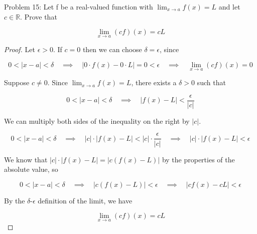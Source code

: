 \usepackage{amsthm}

Problem 15: Let f be a real-valued function with $\lim_{x \rightarrow a} f(x) = L$ and let $c \in \mathbb{R}$. Prove that 

$$ \lim_{x \rightarrow a} (cf)(x) = cL $$

\begin{proof}
Let $\epsilon > 0$. If $c = 0$ then we can choose $\delta = \epsilon$, since

$$ 0 < |x - a| < \delta \quad \implies \quad |0 \cdot f(x) - 0 \cdot L| = 0 < \epsilon \quad \implies \quad \lim_{x \rightarrow a} (cf)(x) = 0$$

Suppose $c \neq 0$. Since $\lim_{x \rightarrow a} f(x) = L$, there exists a $\delta > 0$ such that

$$ 0 < |x - a| < \delta \quad \implies \quad |f(x) - L| < \frac{\epsilon}{|c|} $$

We can multiply both sides of the inequality on the right by $|c|$.

$$ 0 < |x - a| < \delta \quad \implies \quad |c| \cdot |f(x) - L| < |c| \cdot \frac{\epsilon}{|c|} \quad \implies \quad |c| \cdot |f(x) - L| < \epsilon $$

We know that $|c| \cdot |f(x) - L| = |c(f(x) - L)|$ by the properties of the absolute value, so

$$ 0 < |x - a| < \delta \quad \implies \quad |c(f(x) - L)| < \epsilon \quad \implies \quad |cf(x) - cL| < \epsilon $$

By the $\delta$-$\epsilon$ definition of the limit, we have

$$ \lim_{x \rightarrow a} (cf)(x) = cL $$
\end{proof}
